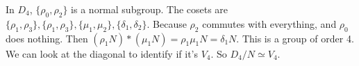 \documentclass[class=article,crop=false]{standalone}
\begin{document}
\begin{eg}[]
	In $ D_4$, $ \{\rho_0, \rho_2\} $ is a normal subgroup. The cosets are $ \{\rho_1, \rho_3\}, \{\rho_1, \rho_3\} , \{\mu_1, \mu_2\}, \{\delta_1, \delta_2\}  $. Because $\rho_2$ commutes with everything, and $ \rho_0$ does nothing. Then $ (\rho_1 N)*(\mu_1 N) = \rho_1 \mu_1 N = \delta_1 N$. This is a group of order 4. We can look at the diagonal to identify if it's $ V_4$. So $ D_4 / N \simeq V_4$. 
\end{eg}
\end{document}
